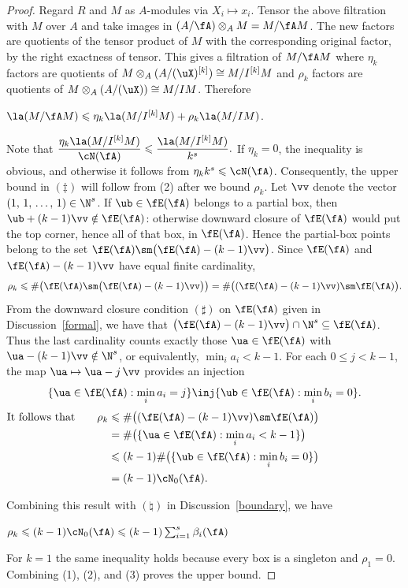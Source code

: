 \documentclass[12pt]{amsart}
\theoremstyle{plain}
\theoremstyle{remark}
\theoremstyle{definition}
\numberwithin{equation}{theorem}
\begin{document}
\begin{proof}
Regard $R$ and $M$ as $A$-modules via $X_i\mapsto x_i$. Tensor the above 
filtration with $M$ over $A$ and take images in
$(A/\fA)\otimes_A M=M/\fA M$.
The new factors are quotients of the tensor product of $M$ with the corresponding 
original factor, by the right exactness of tensor. This gives a filtration of 
$M/\fA M$ where $\eta_k$ factors are quotients of 
$M \otimes_A (A/(\uX)^{[k]}) \cong M/I^{[k]}M$ 
and $\rho_k$ factors are quotients of $M \otimes_A (A/(\uX)) \cong M/IM$.
Therefore
\benr
\item $\la(M/\fA M)\leq\eta_k\la(M/I^{[k]}M)+\rho_k\la(M/IM)$.  %
\een

Note that $\displaystyle \frac{\eta_k\la(M/I^{[k]}M)}{\cN(\fA)}
\leq\frac{\la(M/I^{[k]}M)}{k^s}.$ If $\eta_k=0$, the inequality is obvious, and otherwise it follows from $\eta_k k^s \leq \cN(\fA)$. Consequently, the upper bound in 
$(\ddagger)$ will follow from 
(2) after we bound $\rho_k$.
Let $\vv$ denote the vector $(1,\,1,\, \ldots,\, 1) \in \N^s$.
If $\ub\in \fE(\fA)$ belongs to a
partial box, then $\ub+(k-1)\vv \notin \fE(\fA)$: otherwise
downward closure of $\fE(\fA)$ would put the top corner, hence all of
that box, in $\fE(\fA)$. Hence the partial-box points belong to the set
$\fE(\fA)\sm\big(\fE(\fA)-(k-1)\vv\big)$. Since $\fE(\fA)$ and $\fE(\fA)-(k-1)\vv$ 
have equal finite cardinality, 
\[
 \rho_k\leq\#\big(\fE(\fA)\sm\big(\fE(\fA)-(k-1)\vv\big)\big)
 =\#\big((\fE(\fA)-(k-1)\vv)\sm \fE(\fA)\big).
\]
From the downward closure condition $(\sharp)$ on $\fE(\fA)$ given in 
Discussion~\ref{formal}, we  
have that $\big(\fE(\fA)-(k-1)\vv\big)\cap\N^s\subseteq \fE(\fA)$.
Thus the last cardinality counts exactly those $\ua\in \fE(\fA)$
with $\ua - (k-1)\vv \notin \N^s$, or equivalently, $\min_i a_i <k-1 $. 
For each $0\leq j < k-1$, the map $\ua \mapsto \ua - j\,\vv$ provides an injection
\[\{\ua\in \fE(\fA):\min_i a_i=j\} \inj  \{\ub\in \fE(\fA):\min_i b_i=0\}.\]
$\begin{aligned} {\hbox{\rm It\ follows\ that\qquad } \rho_k}  &\leq \#\big((\fE(\fA)-(k-1)\vv)\sm \fE(\fA)\big) \\
               & =\#\big(\{\ua \in \fE(\fA) : \min_i a_i < k-1\}\big) \\
              &\leq (k-1)\#\big(\{\ub \in \fE(\fA) : \min_i b_i = 0 \}\big) \\     
              & = (k-1) \cN_0(\fA).  \end{aligned}$

Combining this result with $(\natural)$ in Discussion~\ref{boundary}, we have
\benr 
\item $\rho_k \leq (k-1)\cN_0(\fA) \leq (k-1)\sum_{i=1}^s \beta_i(\fA)$ 
\een  %

For $k=1$ the same inequality holds because every box is a
singleton and $\rho_1=0$. Combining (1), (2), and (3) proves the upper bound.
\end{proof}
\end{document}
